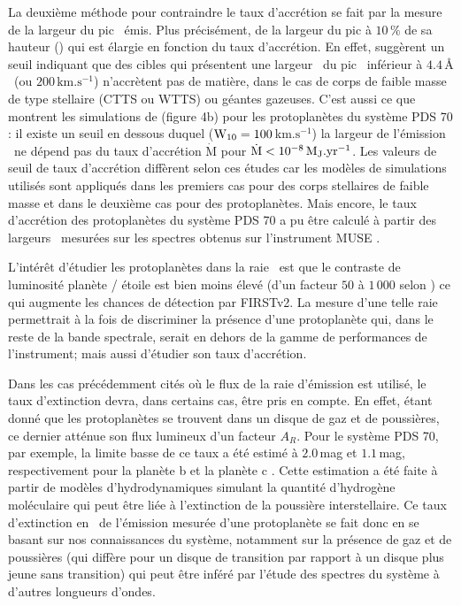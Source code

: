 La deuxième méthode pour contraindre le taux d'accrétion se fait par la mesure de la largeur du pic \ha~émis. Plus précisément, de la largeur du pic à $10 \, \%$ de sa hauteur (\Wd) qui est élargie en fonction du taux d'accrétion. En effet, \cite{natta2004, fang2009} suggèrent un seuil indiquant que des cibles qui présentent une largeur \Wd~du pic \ha~inférieur à $4.4 \,$\AA $\,$ (ou $200 \, \text{km}.\text{s}^{-1}$) n'accrètent pas de matière, dans le cas de corps de faible masse de type stellaire (\ac{CTTS} ou \ac{WTTS}) ou géantes gazeuses. C'est aussi ce que montrent les simulations de \cite{thanathibodee2019} (figure 4b) pour les protoplanètes du système PDS 70 : il existe un seuil en dessous duquel ($\text{$\text{W}_{10}$} = 100 \,$km.$\text{s}^{-1}$) la largeur de l'émission \ha~ne dépend pas du taux d'accrétion $\dot{\text{M}}$ pour $\dot{\text{M}} < 10^{-8} \, \text{$\text{M}_\text{J}$}.\text{yr}^{-1}$. Les valeurs de seuil de taux d'accrétion diffèrent selon ces études car les modèles de simulations utilisés sont appliqués dans les premiers cas pour des corps stellaires de faible masse et dans le deuxième cas pour des protoplanètes. Mais encore, le taux d'accrétion des protoplanètes du système PDS 70 a pu être calculé à partir des largeurs \Wd~mesurées sur les spectres obtenus sur l'instrument MUSE \cite{haffert2019, hashimoto2020}.

L'intérêt d'étudier les protoplanètes dans la raie \ha~est que le contraste de luminosité planète / étoile est bien moins élevé (d'un facteur $50$ à $1\,000$ selon \cite{close2014}) ce qui augmente les chances de détection par \ac{FIRSTv2}. La mesure d'une telle raie permettrait à la fois de discriminer la présence d'une protoplanète qui, dans le reste de la bande spectrale, serait en dehors de la gamme de performances de l'instrument; mais aussi d'étudier son taux d'accrétion.

Dans les cas précédemment cités où le flux de la raie d'émission est utilisé, le taux d'extinction devra, dans certains cas, être pris en compte. En effet, étant donné que les protoplanètes se trouvent dans un disque de gaz et de poussières, ce dernier atténue son flux lumineux d'un facteur $A_R$. Pour le système PDS 70, par exemple, la limite basse de ce taux a été estimé à $2.0 \,$mag et $1.1 \,$mag, respectivement pour la planète b et la planète c \citep{hashimoto2020}. Cette estimation a été faite à partir de modèles d'hydrodynamiques simulant la quantité d'hydrogène moléculaire qui peut être liée à l'extinction de la poussière interstellaire. Ce taux d'extinction en \ha~de l'émission mesurée d'une protoplanète se fait donc en se basant sur nos connaissances du système, notamment sur la présence de gaz et de poussières (qui diffère pour un disque de transition par rapport à un disque plus jeune sans transition) qui peut être inféré par l'étude des spectres du système à d'autres longueurs d'ondes.

